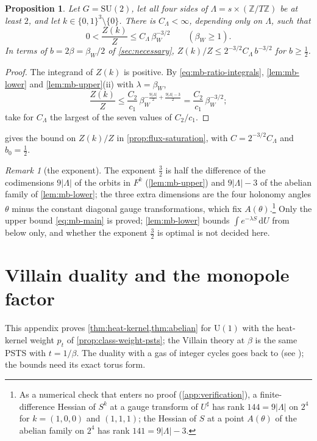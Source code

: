 \documentclass[11pt,a4paper]{amsart}
\newtheorem{proposition}[theorem]{Proposition}
\theoremstyle{definition}
\theoremstyle{remark}
\newtheorem{remark}[theorem]{Remark}
\numberwithin{equation}{section}
\newcommand{\Z}{\mathbb{Z}}          %
\newcommand{\abs}[1]{\lvert #1\rvert}      %
\newcommand{\dd}{\,\mathrm{d}}             %
\newcommand{\SU}{\mathrm{SU}}              %
\newcommand{\U}{\mathrm{U}}                %
\newcommand{\PSTS}{\textup{PSTS}}          %
\newcommand{\betaW}{\beta_{W}}             %
\begin{document}
\begin{proposition}\label{prop:mb-ratio}
Let $G=\SU(2)$, let all four sides of $\Lambda=s\times(\Z/T\Z)$ be at least $2$, and let $k\in\{0,1\}^3\setminus\{0\}$. There is $C_\Lambda<\infty$, depending only on $\Lambda$, such that
\begin{equation}\label{eq:mb-main}
0<\frac{Z(k)}Z\le C_\Lambda\,\betaW^{-3/2}\qquad(\betaW\ge1).
\end{equation}
In terms of $b=2\beta=\betaW/2$ of \cref{sec:necessary}, $Z(k)/Z\le2^{-3/2}C_\Lambda\,b^{-3/2}$ for $b\ge\frac12$.
\end{proposition}

\begin{proof}
The integrand of $Z(k)$ is positive. By \eqref{eq:mb-ratio-integrals}, \cref{lem:mb-lower} and \cref{lem:mb-upper}(ii) with $\lambda=\betaW$,
\[
\frac{Z(k)}Z\le\frac{C_2}{c_1}\,\betaW^{-\frac{9\abs\Lambda}2+\frac{9\abs\Lambda-3}2}=\frac{C_2}{c_1}\,\betaW^{-3/2};
\]
take for $C_\Lambda$ the largest of the seven values of $C_2/c_1$.
\end{proof}

 gives the bound on $Z(k)/Z$ in \cref{prop:flux-saturation}, with $C=2^{-3/2}C_\Lambda$ and $b_0=\frac12$.

\begin{remark}[the exponent]\label{rem:mb-exponent}
The exponent $\frac32$ is half the difference of the codimensions $9\abs\Lambda$ of the orbits in $F^k$ (\cref{lem:mb-upper}) and $9\abs\Lambda-3$ of the abelian family of \cref{lem:mb-lower}; the three extra dimensions are the four holonomy angles $\theta$ minus the constant diagonal gauge transformations, which fix $A(\theta)$.\footnote{As a numerical check that enters no proof (\cref{app:verification}), a finite-difference Hessian of $S^k$ at a gauge transform of $U^\sharp$ has rank $144=9\abs\Lambda$ on $2^4$ for $k=(1,0,0)$ and $(1,1,1)$; the Hessian of $S$ at a point $A(\theta)$ of the abelian family on $2^4$ has rank $141=9\abs\Lambda-3$.} Only the upper bound \eqref{eq:mb-main} is proved; \cref{lem:mb-lower} bounds $\int e^{-\lambda S}\dd U$ from below only, and whether the exponent $\frac32$ is optimal is not decided here.
\end{remark}
\section{Villain duality and the monopole factor}\label{app:villain}

This appendix proves \cref{thm:heat-kernel,thm:abelian} for $\U(1)$ with the heat-kernel weight $p_t$ of \cref{prop:class-weight-psts}; the Villain theory at $\beta$ is the same \PSTS{} with $t=1/\beta$. The duality with a gas of integer cycles goes back to \cite{banks1977} (see \cite{savit1980}); the bounds need its exact torus form.
\end{document}
